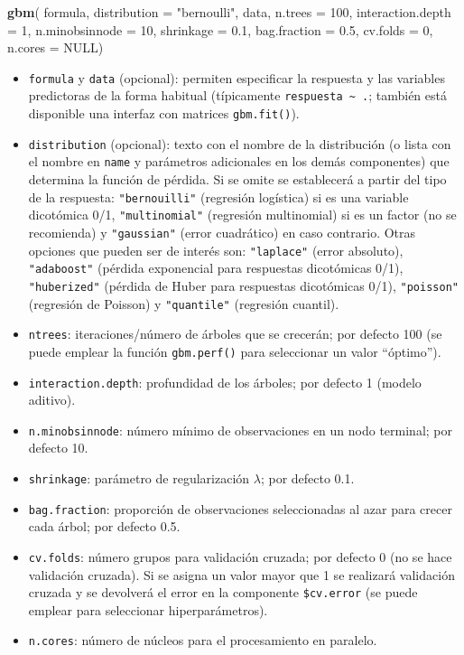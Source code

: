 \documentclass[
]{book}
\newenvironment{Shaded}{\begin{snugshade}}{\end{snugshade}}
\newcommand{\DataTypeTok}[1]{\textcolor[rgb]{0.13,0.29,0.53}{#1}}
\newcommand{\DecValTok}[1]{\textcolor[rgb]{0.00,0.00,0.81}{#1}}
\newcommand{\FloatTok}[1]{\textcolor[rgb]{0.00,0.00,0.81}{#1}}
\newcommand{\KeywordTok}[1]{\textcolor[rgb]{0.13,0.29,0.53}{\textbf{#1}}}
\newcommand{\NormalTok}[1]{#1}
\newcommand{\OtherTok}[1]{\textcolor[rgb]{0.56,0.35,0.01}{#1}}
\newcommand{\StringTok}[1]{\textcolor[rgb]{0.31,0.60,0.02}{#1}}
\theoremstyle{break}
\theoremstyle{definition}
\theoremstyle{definition}
\theoremstyle{definition}
\theoremstyle{remark}
\begin{document}
\begin{Shaded}
\begin{Highlighting}[]
\KeywordTok{gbm}\NormalTok{( formula, }\DataTypeTok{distribution =} \StringTok{"bernoulli"}\NormalTok{, data, }\DataTypeTok{n.trees =} \DecValTok{100}\NormalTok{, }
     \DataTypeTok{interaction.depth =} \DecValTok{1}\NormalTok{, }\DataTypeTok{n.minobsinnode =} \DecValTok{10}\NormalTok{,}
     \DataTypeTok{shrinkage =} \FloatTok{0.1}\NormalTok{, }\DataTypeTok{bag.fraction =} \FloatTok{0.5}\NormalTok{, }
     \DataTypeTok{cv.folds =} \DecValTok{0}\NormalTok{, }\DataTypeTok{n.cores =} \OtherTok{NULL}\NormalTok{)}
\end{Highlighting}
\end{Shaded}

\begin{itemize}
\item
  \texttt{formula} y \texttt{data} (opcional): permiten especificar la respuesta y las variables predictoras de la forma habitual (típicamente \texttt{respuesta\ \textasciitilde{}\ .}; también está disponible una interfaz con matrices \texttt{gbm.fit()}).
\item
  \texttt{distribution} (opcional): texto con el nombre de la distribución (o lista con el nombre en \texttt{name} y parámetros adicionales en los demás componentes) que determina la función de pérdida.
  Si se omite se establecerá a partir del tipo de la respuesta: \texttt{"bernouilli"} (regresión logística) si es una variable dicotómica 0/1, \texttt{"multinomial"} (regresión multinomial) si es un factor (no se recomienda) y \texttt{"gaussian"} (error cuadrático) en caso contrario.
  Otras opciones que pueden ser de interés son: \texttt{"laplace"} (error absoluto), \texttt{"adaboost"} (pérdida exponencial para respuestas dicotómicas 0/1), \texttt{"huberized"} (pérdida de Huber para respuestas dicotómicas 0/1), \texttt{"poisson"} (regresión de Poisson) y \texttt{"quantile"} (regresión cuantil).
\item
  \texttt{ntrees}: iteraciones/número de árboles que se crecerán; por defecto 100 (se puede emplear la función \texttt{gbm.perf()} para seleccionar un valor ``óptimo'').
\item
  \texttt{interaction.depth}: profundidad de los árboles; por defecto 1 (modelo aditivo).
\item
  \texttt{n.minobsinnode}: número mínimo de observaciones en un nodo terminal; por defecto 10.
\item
  \texttt{shrinkage}: parámetro de regularización \(\lambda\); por defecto 0.1.
\item
  \texttt{bag.fraction}: proporción de observaciones seleccionadas al azar para crecer cada árbol; por defecto 0.5.
\item
  \texttt{cv.folds}: número grupos para validación cruzada; por defecto 0 (no se hace validación cruzada). Si se asigna un valor mayor que 1 se realizará validación cruzada y se devolverá el error en la componente \texttt{\$cv.error} (se puede emplear para seleccionar hiperparámetros).
\item
  \texttt{n.cores}: número de núcleos para el procesamiento en paralelo.
\end{itemize}
\end{document}
